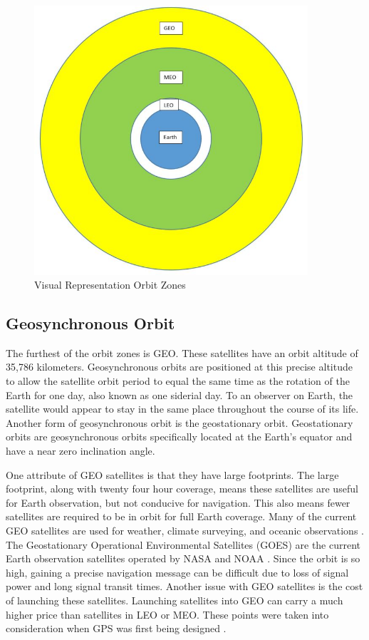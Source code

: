 \documentclass[12pt]{report}
\begin{document}
\begin{figure}
    \centering
    \includegraphics[width=4in]{satellite_orbit_zones.JPG}
    \caption{Visual Representation Orbit Zones}
    \label{fig:satorbzone}

\end{figure}

\subsection{Geosynchronous Orbit}
The furthest of the orbit zones is GEO. These satellites have an orbit altitude of 35,786 kilometers. Geosynchronous orbits are positioned at this precise altitude to allow the satellite orbit period to equal the same time as the rotation of the Earth for one day, also known as one siderial day. To an observer on Earth, the satellite would appear to stay in the same place throughout the course of its life. Another form of geosynchronous orbit is the geostationary orbit. Geostationary orbits are geosynchronous orbits specifically located at the Earth's equator and have a near zero inclination angle. 

One attribute of GEO satellites is that they have large footprints. The large footprint, along with twenty four hour coverage, means these satellites are useful for Earth observation, but not conducive for navigation. This also means fewer satellites are required to be in orbit for full Earth coverage. Many of the current GEO satellites are used for weather, climate surveying, and oceanic observations \cite{usdepartmentofcommerceSatellites}. The Geostationary Operational Environmental Satellites (GOES) are the current Earth observation satellites operated by NASA and NOAA \cite{garnerGOESOverviewHistory2015}. Since the orbit is so high, gaining a precise navigation message can be difficult due to loss of signal power and long signal transit times. Another issue with GEO satellites is the cost of launching these satellites. Launching satellites into GEO can carry a much higher price than satellites in LEO or MEO. These points were taken into consideration when GPS was first being designed \cite{misraGlobalPositioningSystem2012}.
\end{document}
